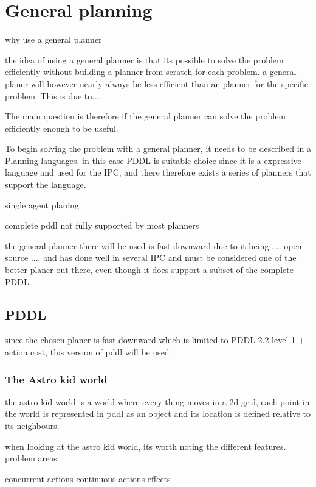 \section{General planning}
	why use a general planner

	the idea of using a general planner is that its possible to solve the problem efficiently without building a planner from scratch for each problem. a general planer will however nearly always be less efficient than an planner for the specific problem. This is due to....
	
	The main question is therefore if the general planner can solve the problem efficiently enough to be useful.

	To begin solving the problem with a general planner, it needs to be described in a Planning languages. in this case PDDL is suitable choice since it is a expressive language and used for the IPC, and there therefore exists a series of planners that support the language.
 
  
	single agent planing
	  
	complete pddl not fully supported by most planners
	
	the general planner there will be used is fast downward due to it being  .... open source .... and has done well in several IPC and must be considered one of the better planer out there, even though it does support a subset of the complete PDDL.
 
 \subsection{PDDL}
	
	since the chosen planer is fast downward which is limited to PDDL 2.2 level 1 + action cost, this version of pddl will be used

	
	
	\subsubsection{The Astro kid world}
	the astro kid world is a world where every thing moves in a 2d grid, each point in the world is represented in pddl as an object and its location is defined relative to its neighbours.
	
	
	when looking at the astro kid world, its worth noting the different features.
	 problem areas
	 
	 concurrent actions
	 continuous actions effects
	
	
		
